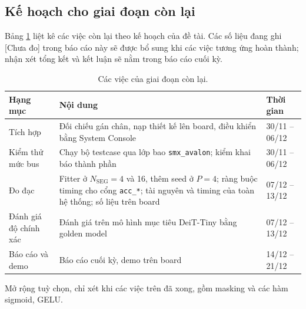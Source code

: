 \subsection{Kế hoạch cho giai đoạn còn lại}

Bảng \ref{tab:plan} liệt kê các việc còn lại theo kế hoạch của đề tài. Các số liệu đang ghi [Chưa đo] trong báo cáo này sẽ được bổ sung khi các việc tương ứng hoàn thành; nhận xét tổng kết và kết luận sẽ nằm trong báo cáo cuối kỳ.

\begin{table}[htbp]
\centering
\small
\begin{tabular}{lp{8.6cm}l}
\toprule
Hạng mục & Nội dung & Thời gian \\
\midrule
Tích hợp & Đối chiếu gán chân, nạp thiết kế lên board, điều khiển bằng System Console & 30/11 -- 06/12 \\
Kiểm thử mức bus & Chạy bộ testcase qua lớp bao \texttt{smx\_avalon}; kiểm khai báo thành phần & 30/11 -- 06/12 \\
Đo đạc & Fitter ở $N_{\text{SEG}} = 4$ và 16, thêm seed ở $P = 4$; ràng buộc timing cho cổng \texttt{acc\_*}; tài nguyên và timing của toàn hệ thống; số liệu trên board & 07/12 -- 13/12 \\
Đánh giá độ chính xác & Đánh giá trên mô hình mục tiêu DeiT-Tiny bằng golden model & 07/12 -- 13/12 \\
Báo cáo và demo & Báo cáo cuối kỳ, demo trên board & 14/12 -- 21/12 \\
\bottomrule
\end{tabular}
\caption{Các việc của giai đoạn còn lại.}
\label{tab:plan}
\end{table}

Mở rộng tuỳ chọn, chỉ xét khi các việc trên đã xong, gồm masking và các hàm sigmoid, GELU.
